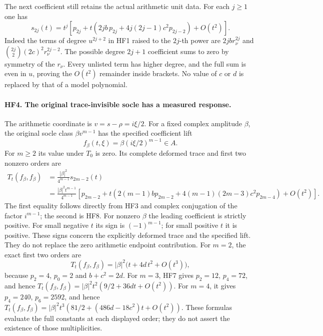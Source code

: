 The next coefficient still retains the actual arithmetic unit data.
For each $j\ge1$ one has
\[
 \boxed{s_{2j}(t)=t^j\left[
    p_{2j}+t\left(2jb\,p_{2j}
                +4j(2j-1)c^2p_{2j-2}\right)+O(t^2)\right].}
 \tag{HF8}
\]
Indeed the terms of degree $u^{2j+2}$ in HF1 raised to the
$2j$-th power are $2jb r_\nu^{2j}$ and
$\binom{2j}{2}(2c)^2r_\nu^{2j-2}$. The possible degree
$2j+1$ coefficient sums to zero by symmetry of the $r_\nu$.
Every unlisted term has higher degree, and the full sum is even
in $u$, proving the $O(t^2)$ remainder inside brackets.
No value of $c$ or $d$ is replaced by that of a model polynomial.

\paragraph{HF4. The original trace-invisible socle has a measured response.}
The arithmetic coordinate is $v=s-\rho=i\xi/2$. For a fixed
complex amplitude $\beta$, the original socle class
$\beta v^{m-1}$ has the specified coefficient lift
\[
 f_\beta(t,\xi)=\beta(i\xi/2)^{m-1}\in A.
 \tag{HF9}
\]
For $m\ge2$ its value under $T_0$ is zero. Its complete deformed
trace and first two nonzero orders are
\[
 \begin{split}
 T_t(f_\beta,f_\beta)
   &=\frac{|\beta|^2}{4^{m-1}}s_{2m-2}(t)\\
   &=\frac{|\beta|^2t^{m-1}}{4^{m-1}}
       \left[p_{2m-2}+t\left(
           2(m-1)b p_{2m-2}
          +4(m-1)(2m-3)c^2p_{2m-4}\right)+O(t^2)\right].
 \end{split}
 \tag{HF10}
\]
The first equality follows directly from HF3 and complex conjugation
of the factor $i^{m-1}$; the second is HF8. For nonzero $\beta$
the leading coefficient is strictly positive. For small negative
$t$ its sign is $(-1)^{m-1}$; for small positive $t$ it is positive.
These signs concern the explicitly deformed trace and the specified
lift. They do not replace the zero arithmetic endpoint contribution.
For $m=2$, the exact first two orders are
\[
 T_t(f_\beta,f_\beta)
   =|\beta|^2\bigl(t+4d\,t^2+O(t^3)\bigr),
 \tag{HF11}
\]
because $p_2=4$, $p_0=2$ and $b+c^2=2d$.
For $m=3$, HF7 gives $p_2=12$, $p_4=72$, and hence
$T_t(f_\beta,f_\beta)=|\beta|^2t^2(9/2+36dt+O(t^2))$.
For $m=4$, it gives $p_4=240$, $p_6=2592$, and hence
$T_t(f_\beta,f_\beta)=|\beta|^2t^3(81/2+(486d-18c^2)t+O(t^2))$.
These formulas evaluate the full constants at each displayed order;
they do not assert the existence of those multiplicities.

